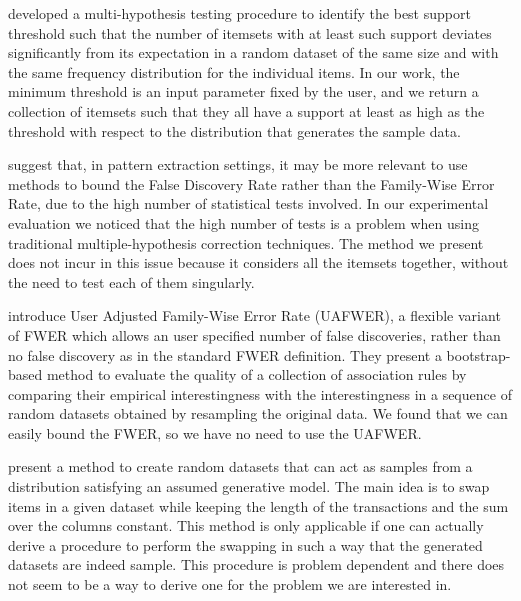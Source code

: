 \citet{KirschMAPUV12} developed a multi-hypothesis
testing procedure to identify the best support threshold such that the number of
itemsets with at least such support deviates significantly from its expectation
in a random dataset of the same size and with the same frequency distribution
for the individual items. In our work, the minimum threshold is an input
parameter fixed by the user, and we return a collection of itemsets such that
they all have a support at least as high as the threshold with respect to the
distribution that generates the sample data.

\citet{BoltonHA02} suggest that, in pattern extraction settings,
it may be more relevant to use methods to bound the False Discovery Rate rather
than the Family-Wise Error Rate, due to the high number of statistical tests
involved. In our experimental evaluation we noticed that the high number of
tests is a problem when using traditional multiple-hypothesis correction
techniques. The method we present does not incur in this issue because it
considers all the itemsets together, without the need to test each of them
singularly. 

\citet{LallichTP06} introduce User Adjusted
Family-Wise Error Rate (UAFWER), a flexible variant of FWER which allows an user
specified number of false discoveries, rather than no false discovery as in the
standard FWER definition. They present a bootstrap-based method to evaluate the
quality of a collection of association rules by comparing their empirical
interestingness with the interestingness in a sequence of random datasets
obtained by resampling the original data. We found that we can easily bound the
FWER, so we have no need to use the UAFWER.

\citet{GionisMMT07} present a method to create random datasets that can act as
samples from a distribution satisfying an assumed generative model. The main
idea is to swap items in a given dataset while keeping the length of the
transactions and the sum over the columns constant. This method is only
applicable if one can actually derive a procedure to perform the swapping in
such a way that the generated datasets are indeed sample. This procedure is
problem dependent and there does not seem to be a way to derive one for the
problem we are interested in.

